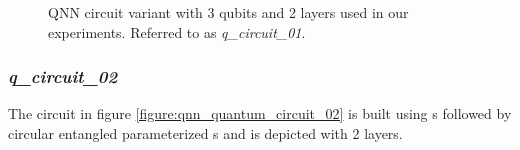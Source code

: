 \begin{figure}[!h]
	\centering
	\caption{QNN circuit variant with 3 qubits and 2 layers used in our experiments. Referred to as \textit{q\_circuit\_01}.}
	\label{figure:qnn_quantum_circuit_01}
\end{figure}

\subsubsection{\textit{q\_circuit\_02}}
\label{subsubsection:qnn_quantum_circuit_02}
The circuit in figure \ref{figure:qnn_quantum_circuit_02} is built using \rygate s followed by circular entangled parameterized \crygate s and is depicted with 2 layers.

